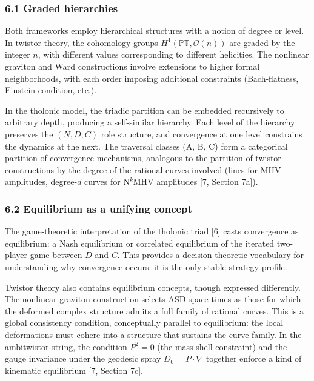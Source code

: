 \documentclass[
  11pt,
  letterpaper,
]{article}
\begin{document}
\subsubsection{6.1 Graded hierarchies}\label{graded-hierarchies}

Both frameworks employ hierarchical structures with a notion of degree
or level. In twistor theory, the cohomology groups
\(H^1(\mathbb{PT}, \mathcal{O}(n))\) are graded by the integer \(n\),
with different values corresponding to different helicities. The
nonlinear graviton and Ward constructions involve extensions to higher
formal neighborhoods, with each order imposing additional constraints
(Bach-flatness, Einstein condition, etc.).

In the tholonic model, the triadic partition can be embedded recursively
to arbitrary depth, producing a self-similar hierarchy. Each level of
the hierarchy preserves the \((N, D, C)\) role structure, and
convergence at one level constrains the dynamics at the next. The
traversal classes (A, B, C) form a categorical partition of convergence
mechanisms, analogous to the partition of twistor constructions by the
degree of the rational curves involved (lines for MHV amplitudes,
degree-\(d\) curves for N\(^k\)MHV amplitudes {[}7, Section 7a{]}).

\subsubsection{6.2 Equilibrium as a unifying
concept}\label{equilibrium-as-a-unifying-concept}

The game-theoretic interpretation of the tholonic triad {[}6{]} casts
convergence as equilibrium: a Nash equilibrium or correlated equilibrium
of the iterated two-player game between \(D\) and \(C\). This provides a
decision-theoretic vocabulary for understanding why convergence occurs:
it is the only stable strategy profile.

Twistor theory also contains equilibrium concepts, though expressed
differently. The nonlinear graviton construction selects ASD space-times
as those for which the deformed complex structure admits a full family
of rational curves. This is a global consistency condition, conceptually
parallel to equilibrium: the local deformations must cohere into a
structure that sustains the curve family. In the ambitwistor string, the
condition \(P^2 = 0\) (the mass-shell constraint) and the gauge
invariance under the geodesic spray \(D_0 = P \cdot \nabla\) together
enforce a kind of kinematic equilibrium {[}7, Section 7c{]}.
\end{document}
